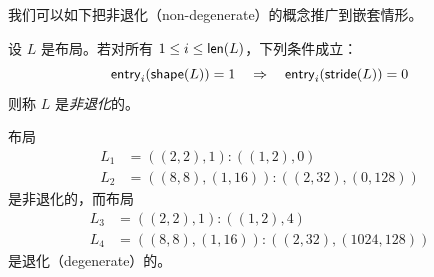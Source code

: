 我们可以如下把非退化（non-degenerate）的概念推广到嵌套情形。

\begin{definition}\label{definitionofnondegeneratelayout}
    设 $L$ 是布局。若对所有 $1 \leq i\leq \mathsf{len}(L)$，下列条件成立：
    \[
    \mathsf{entry}_i(\mathsf{shape}(L)) = 1 \quad \Rightarrow \quad \mathsf{entry}_i(\mathsf{stride}(L)) = 0
    \]
    则称 $L$ 是{\it 非退化}的。
\end{definition}

\begin{example}
    布局
    \begin{align*}
        L_1 & = ((2,2),1):((1,2),0)\\
        L_2 & = ((8,8),(1,16)):((2,32),(0,128))
    \end{align*}
    是非退化的，而布局
    \begin{align*}
        L_3 & = ((2,2),1):((1,2),4)\\
        L_4 & = ((8,8),(1,16)):((2,32),(1024,128))
    \end{align*}
    是退化（degenerate）的。
\end{example}





